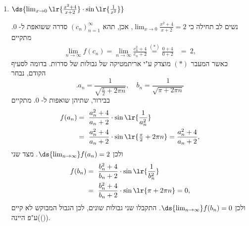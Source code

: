 \begin{enumerate}
\begin{solbox}
נבחר שתי סדרות ששואפות ל-
$0$.
כאן, בניגוד לסעיפים הקודמים, אין לנו יותר מדי חופש בבחירת סדרות שתפרכנה את קיום הגבול, אנו חייבים להתייחס ל"קפריזות" של קוסינוס, כלומר, עלינו לבחור סדרות בחוכמה:

שתי הסדרות חייבות לשאוף ל-
$0$,
ולאחר הרכבת הקוסינוס על הסדרות האלה כדאי לנו לדעת מה הם הערכים שיתקבלו
(הרי קוסינוס היא פונקציה "מסובכת" ואין לנו מידע לגבי ערכיה המדויקים פרט לכמה נקודות בודדות).
יודעים כי
$\cos(x)=1$
אמ"מ
$2\pi n$, $n\in\mathbb{Z}$,
ו-
$\cos(x)=0$
אמ"מ
$x=\tfrac{\pi}{2}+2\pi n$, $n\in\mathbb{Z}$.
לכן נבחר
$$a_n=\frac{1}{\tfrac{\pi}{2}+2\pi n},\quad b_n=\frac{1}{2\pi n}$$
בבירור, שתיהן שואפות ל-
$0$.
מתקיים
\begin{align*}
f(a_n)
=\cos\left(\frac{1}{a_n}\right)
= \cos\left(\tfrac{\pi}{2}+2\pi n\right)
= 0,
\end{align*}
ולכן
$\ds{\lim_{n\to\infty}}f(a_n)=0$.
מצד שני
\begin{align*}
f(b_n)
= \cos\left(\frac{1}{b_n}\right)
=\cos\left(2\pi n\right)
= 1,
\end{align*}
ולכן
$\ds{\lim_{n\to\infty}}f(b_n)=1$.
התקבלו שני גבולות שונים, לכן הגבול המבוקש לא קיים.
\end{solbox}
\fi

\item $\ds{\lim_{x \to 0} \lr{ \frac{x^2+4}{x+2} } \cdot \sin\lr{ \frac{1}{x^2} } }$
\ifsol
{}
\begin{solbox}
נשים לב תחילה כי
$\displaystyle\lim_{x\to0}\frac{x^2+4}{x+2}=2$,
אכן, תהא
$(c_n)_{n=1}^\infty$
סדרה ששואפת ל-
$0$.
מתקיים
\begin{align*}
    \lim_{n\to\infty}f(c_n)=\lim_{n\to\infty}\frac{c_n^2+4}{c_n+2}
    \overset{(\ast)}{=} \frac{0+4}{0+2}
    &=\ 2,
\end{align*}
כאשר המעבר
$(\ast)$
מוצדק ע"י אריתמטיקה של גבולות של סדרות.
בדומה לסעיף הקודם, נבחר
$$.a_n=\frac{1}{\sqrt{\tfrac{\pi}{2}+2\pi n}}
,\quad b_n=\frac{1}{\sqrt{\pi+2\pi n}}$$
בבירור, שתיהן שואפות ל-
$0$.
מתקיים
\begin{align*}
f(a_n)
&=\ \frac{a_n^2+4}{a_n+2}  \cdot \sin\lr{ \frac{1}{a_n^2} }\\
&=\ \frac{a_n^2+4}{a_n+2} \cdot \sin\lr{\tfrac{\pi}{2}+2\pi n}
= \frac{a_n^2+4}{a_n+2},
\end{align*}
ולכן
$\ds{\lim_{n\to\infty}}f(a_n)=2$.
מצד שני
\begin{align*}
f(b_n)
&=\ \frac{b_n^2+4}{b_n+2} \cdot \sin\lr{ \frac{1}{b_n^2} }\\
&=\ \frac{b_n^2+4}{b_n+2}  \cdot \sin\lr{\pi+2\pi n}
= 0,
\end{align*}
ולכן
$\ds{\lim_{n\to\infty}}f(b_n)=0$.
התקבלו שני גבולות שונים, לכן הגבול המבוקש לא קיים
())ע"פ היינה).
\end{solbox}
\fi
\eMs
\end{enumerate}
